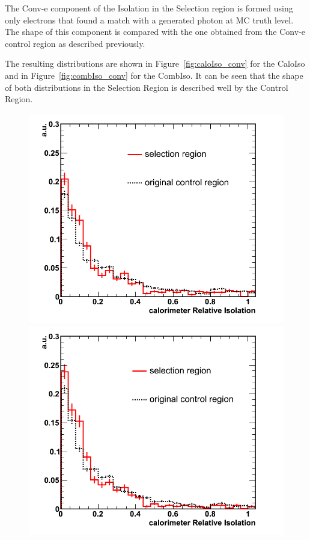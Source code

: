 The Conv-e component of the Isolation in the Selection region is formed using only electrons that found a match with a generated photon at MC truth level. The shape of this component is compared with the one obtained from the Conv-e control region as described previously.  


The resulting distributions are shown in Figure~\ref{fig:caloIso_conv} for the CaloIso and in Figure~\ref{fig:combIso_conv} for the CombIso.  It can be seen that the shape of both distributions in the Selection Region is described well by the Control Region.

\begin{figure}[h!]
\centering
\includegraphics[scale=0.28]{Plots/caloIso_pt10_conv.png}
\includegraphics[scale=0.28]{Plots/caloIso_pt20_conv.png}

\end{figure}
